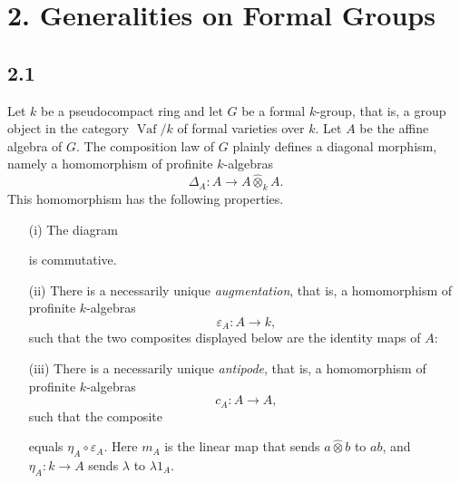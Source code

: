 
\section*{2. Generalities on Formal Groups}
\label{sga3:VIIB:2}

\subsection*{2.1}
\label{sga3:VIIB:2.1}

Let \(k\) be a pseudocompact ring and let \(G\) be a formal
\(k\)-group, that is, a group object in the category
\(\operatorname{Vaf}/k\) of formal varieties over \(k\). Let \(A\)
be the affine algebra of \(G\). The composition law of \(G\) plainly
defines a diagonal morphism, namely a homomorphism of profinite
\(k\)-algebras
\[
  \Delta_A:A\longrightarrow A\widehat\otimes_kA.
\]
This homomorphism has the following properties.

\begin{enumerate}
\item[\textup{\SGAInlineRefTarget{sga3:VIIB:2.1:item:i}(i)}] The diagram
\begin{center}
  \label{sga3:VIIB:2.1:coassociativity-square}
  
\end{center}
is commutative.

\item[\textup{(ii)}] There is a necessarily unique
\emph{augmentation}, that is, a homomorphism of profinite
\(k\)-algebras
\[
  \varepsilon_A:A\longrightarrow k,
\]
such that the two composites displayed below are the identity maps of
\(A\):
\begin{center}
  \label{sga3:VIIB:2.1:counit-compositions}
  
\end{center}

\item[\textup{\SGAInlineRefTarget{sga3:VIIB:2.1:item:iii}(iii)}] There is a necessarily unique \emph{antipode},
that is, a homomorphism of profinite \(k\)-algebras
\[
  c_A:A\longrightarrow A,
\]
such that the composite
\begin{center}
  \label{sga3:VIIB:2.1:antipode-composition}
  
\end{center}
equals \(\eta_A\circ\varepsilon_A\). Here \(m_A\) is the linear map
that sends \(a\widehat\otimes b\) to \(ab\), and
\(\eta_A:k\to A\) sends \(\lambda\) to \(\lambda1_A\).
\end{enumerate}

